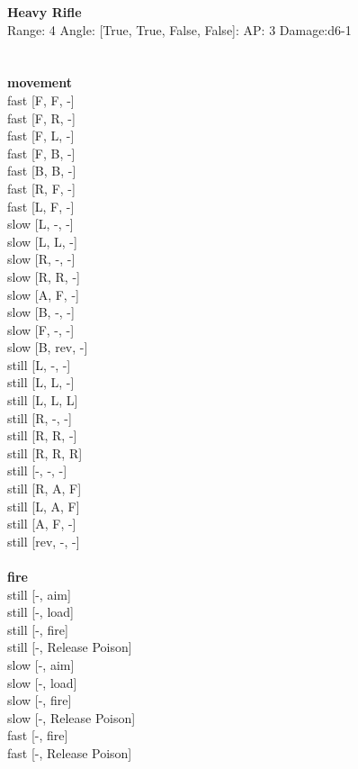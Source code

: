 {\bf Heavy Rifle } \\



Range: 4  Angle: [True, True, False, False]: AP: 3 Damage:d6-1 \\




 
\ \\



\ \\ {\bf movement } \\
fast [F, F, -] \\
fast [F, R, -] \\
fast [F, L, -] \\
fast [F, B, -] \\
fast [B, B, -] \\
fast [R, F, -] \\
fast [L, F, -] \\
slow [L, -, -] \\
slow [L, L, -] \\
slow [R, -, -] \\
slow [R, R, -] \\
slow [A, F, -] \\
slow [B, -, -] \\
slow [F, -, -] \\
slow [B, rev, -] \\
still [L, -, -] \\
still [L, L, -] \\
still [L, L, L] \\
still [R, -, -] \\
still [R, R, -] \\
still [R, R, R] \\
still [-, -, -] \\
still [R, A, F] \\
still [L, A, F] \\
still [A, F, -] \\
still [rev, -, -] \\
\ \\ {\bf fire } \\
still [-, aim] \\
still [-, load] \\
still [-, fire] \\
still [-, Release Poison] \\
slow [-, aim] \\
slow [-, load] \\
slow [-, fire] \\
slow [-, Release Poison] \\
fast [-, fire] \\
fast [-, Release Poison] \\


